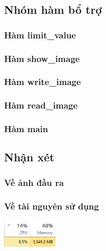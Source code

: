 \documentclass{article}
\begin{document}
\subsection{Nhóm hàm bổ trợ}
\subsubsection{Hàm limit\_value}
\subsubsection{Hàm show\_image}
\subsubsection{Hàm write\_image}
\subsubsection{Hàm read\_image}
\subsubsection{Hàm main}

\newpage
\subsection{Nhận xét}
\subsubsection{Về ảnh đầu ra}

\subsubsection{Về tài nguyên sử dụng}

\centerline{\includegraphics[width=0.2\textwidth]{image/performance.png}}
\newpage
\end{document}
